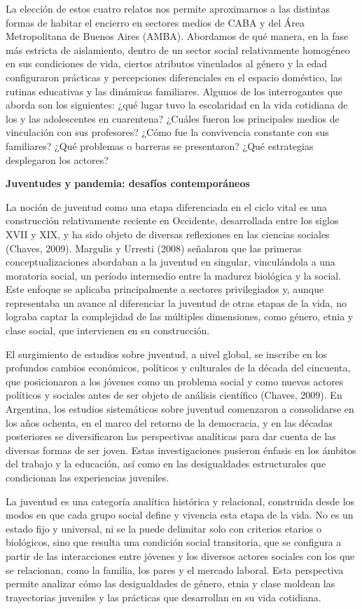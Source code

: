 La elección de estos cuatro relatos nos permite aproximarnos a las distintas formas de habitar el encierro en sectores medios de CABA y del Área Metropolitana de Buenos Aires (AMBA). Abordamos de qué manera, en la fase más estricta de aislamiento, dentro de un sector social relativamente homogéneo en sus condiciones de vida, ciertos atributos vinculados al género y la edad configuraron prácticas y percepciones diferenciales en el espacio doméstico, las rutinas educativas y las dinámicas familiares. Algunos de los interrogantes que aborda son los siguientes: ¿qué lugar tuvo la escolaridad en la vida cotidiana de los y las adolescentes en cuarentena? ¿Cuáles fueron los principales medios de vinculación con sus profesores? ¿Cómo fue la convivencia constante con sus familiares? ¿Qué problemas o barreras se presentaron? ¿Qué estrategias desplegaron los actores?

\textbf{Juventudes y pandemia: desafíos contemporáneos}

La noción de juventud como una etapa diferenciada en el ciclo vital es una construcción relativamente reciente en Occidente, desarrollada entre los siglos XVII y XIX, y ha sido objeto de diversas reflexiones en las ciencias sociales (Chaves, 2009). Margulis y Urresti (2008) señalaron que las primeras conceptualizaciones abordaban a la juventud en singular, vinculándola a una moratoria social, un período intermedio entre la madurez biológica y la social. Este enfoque se aplicaba principalmente a sectores privilegiados y, aunque representaba un avance al diferenciar la juventud de otras etapas de la vida, no lograba captar la complejidad de las múltiples dimensiones, como género, etnia y clase social, que intervienen en su construcción.

El surgimiento de estudios sobre juventud, a nivel global, se inscribe en los profundos cambios económicos, políticos y culturales de la década del cincuenta, que posicionaron a los jóvenes como un problema social y como nuevos actores políticos y sociales antes de ser objeto de análisis científico (Chaves, 2009). En Argentina, los estudios sistemáticos sobre juventud comenzaron a consolidarse en los años ochenta, en el marco del retorno de la democracia, y en las décadas posteriores se diversificaron las perspectivas analíticas para dar cuenta de las diversas formas de ser joven. Estas investigaciones pusieron énfasis en los ámbitos del trabajo y la educación, así como en las desigualdades estructurales que condicionan las experiencias juveniles.

La juventud es una categoría analítica histórica y relacional, construida desde los modos en que cada grupo social define y vivencia esta etapa de la vida. No es un estado fijo y universal, ni se la puede delimitar solo con criterios etarios o biológicos, sino que resulta una condición social transitoria, que se configura a partir de las interacciones entre jóvenes y los diversos actores sociales con los que se relacionan, como la familia, los pares y el mercado laboral. Esta perspectiva permite analizar cómo las desigualdades de género, etnia y clase moldean las trayectorias juveniles y las prácticas que desarrollan en su vida cotidiana.

